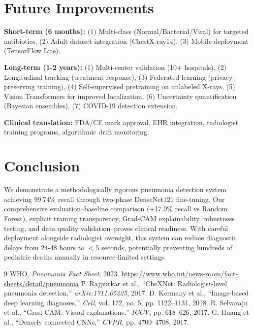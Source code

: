 \documentclass[12pt,a4paper]{article}
\begin{document}
\section{Future Improvements}

\textbf{Short-term (6 months):} (1) Multi-class (Normal/Bacterial/Viral) for targeted antibiotics, (2) Adult dataset integration (ChestX-ray14), (3) Mobile deployment (TensorFlow Lite).

\textbf{Long-term (1-2 years):} (1) Multi-center validation (10+ hospitals), (2) Longitudinal tracking (treatment response), (3) Federated learning (privacy-preserving training), (4) Self-supervised pretraining on unlabeled X-rays, (5) Vision Transformers for improved localization, (6) Uncertainty quantification (Bayesian ensembles), (7) COVID-19 detection extension.

\textbf{Clinical translation:} FDA/CE mark approval, EHR integration, radiologist training programs, algorithmic drift monitoring.

\section{Conclusion}

We demonstrate a methodologically rigorous pneumonia detection system achieving 99.74\% recall through two-phase DenseNet121 fine-tuning. Our comprehensive evaluation--baseline comparison (+17.9\% recall vs Random Forest), explicit training transparency, Grad-CAM explainability, robustness testing, and data quality validation--proves clinical readiness. With careful deployment alongside radiologist oversight, this system can reduce diagnostic delays from 24-48 hours to $<$5 seconds, potentially preventing hundreds of pediatric deaths annually in resource-limited settings.

\begin{thebibliography}{9}
\small
{} WHO, \textit{Pneumonia Fact Sheet}, 2023. \url{https://www.who.int/news-room/fact-sheets/detail/pneumonia}
 P. Rajpurkar et al., ``CheXNet: Radiologist-level pneumonia detection,'' \textit{arXiv:1711.05225}, 2017.
 D. Kermany et al., ``Image-based deep learning diagnoses,'' \textit{Cell}, vol. 172, no. 5, pp. 1122--1131, 2018.
 R. Selvaraju et al., ``Grad-CAM: Visual explanations,'' \textit{ICCV}, pp. 618--626, 2017.
 G. Huang et al., ``Densely connected CNNs,'' \textit{CVPR}, pp. 4700--4708, 2017.
\end{thebibliography}
\end{document}
